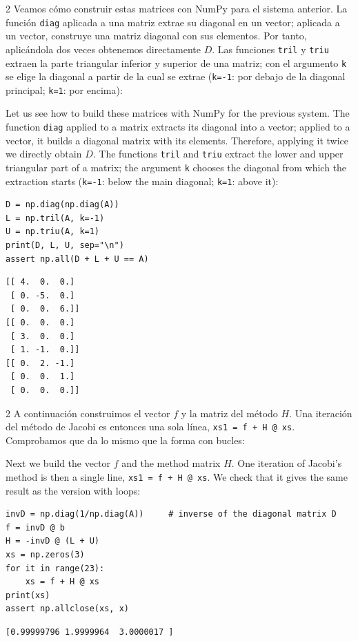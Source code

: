 \begin{paracol}{2}
\switchcolumn
Veamos cómo construir estas matrices con NumPy para el sistema anterior. La función \texttt{diag} aplicada a una matriz extrae su diagonal en un vector; aplicada a un vector, construye una matriz diagonal con sus elementos. Por tanto, aplicándola dos veces obtenemos directamente $D$. Las funciones \texttt{tril} y \texttt{triu} extraen la parte triangular inferior y superior de una matriz; con el argumento \texttt{k} se elige la diagonal a partir de la cual se extrae (\texttt{k=-1}: por debajo de la diagonal principal; \texttt{k=1}: por encima):

\switchcolumn
Let us see how to build these matrices with NumPy for the previous system. The function \texttt{diag} applied to a matrix extracts its diagonal into a vector; applied to a vector, it builds a diagonal matrix with its elements. Therefore, applying it twice we directly obtain $D$. The functions \texttt{tril} and \texttt{triu} extract the lower and upper triangular part of a matrix; the argument \texttt{k} chooses the diagonal from which the extraction starts (\texttt{k=-1}: below the main diagonal; \texttt{k=1}: above it):
\end{paracol}

\begin{verbatim}
D = np.diag(np.diag(A))
L = np.tril(A, k=-1)
U = np.triu(A, k=1)
print(D, L, U, sep="\n")
assert np.all(D + L + U == A)
\end{verbatim}
\begin{verbatim}
[[ 4.  0.  0.]
 [ 0. -5.  0.]
 [ 0.  0.  6.]]
[[ 0.  0.  0.]
 [ 3.  0.  0.]
 [ 1. -1.  0.]]
[[ 0.  2. -1.]
 [ 0.  0.  1.]
 [ 0.  0.  0.]]
\end{verbatim}

\begin{paracol}{2}
A continuación construimos el vector $f$ y la matriz del método $H$. Una iteración del método de Jacobi es entonces una sola línea, \texttt{xs1 = f + H @ xs}. Comprobamos que da lo mismo que la forma con bucles:

\switchcolumn
Next we build the vector $f$ and the method matrix $H$. One iteration of Jacobi's method is then a single line, \texttt{xs1 = f + H @ xs}. We check that it gives the same result as the version with loops:
\end{paracol}
\begin{verbatim}
invD = np.diag(1/np.diag(A))     # inverse of the diagonal matrix D
f = invD @ b
H = -invD @ (L + U)
xs = np.zeros(3)
for it in range(23):
    xs = f + H @ xs
print(xs)
assert np.allclose(xs, x)
\end{verbatim}
\begin{verbatim}
[0.99999796 1.9999964  3.0000017 ]
\end{verbatim}

